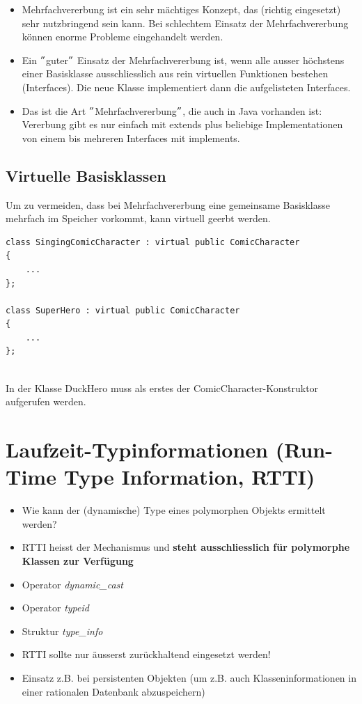 \begin{itemize}
	\item Mehrfachvererbung ist ein sehr mächtiges Konzept, das (richtig eingesetzt) sehr nutzbringend sein kann. Bei schlechtem Einsatz der Mehrfachvererbung können enorme Probleme eingehandelt werden.
	\item Ein $"$guter$"$ Einsatz der Mehrfachvererbung ist, wenn alle ausser höchstens einer Basisklasse ausschliesslich aus rein virtuellen Funktionen bestehen (Interfaces). Die neue Klasse implementiert dann die aufgelisteten Interfaces.
	\item Das ist die Art $"$Mehrfachvererbung$"$, die auch in Java vorhanden ist: Vererbung gibt es nur einfach mit extends plus beliebige Implementationen von einem bis mehreren Interfaces mit implements.
\end{itemize}

\subsection{Virtuelle Basisklassen}
Um zu vermeiden, dass bei Mehrfachvererbung eine gemeinsame Basisklasse mehrfach im Speicher vorkommt, kann virtuell geerbt werden.\\
\begin{minipage}{0.75\linewidth}
	\vspace{-\baselineskip}
\begin{lstlisting}
class SingingComicCharacter : virtual public ComicCharacter
{
	...
};

class SuperHero : virtual public ComicCharacter
{
	...
};
\end{lstlisting}
\end{minipage}\\
In der Klasse DuckHero muss als erstes der ComicCharacter-Konstruktor aufgerufen werden.

\section{Laufzeit-Typinformationen (Run-Time Type Information, RTTI)}
\begin{itemize}
	\item Wie kann der (dynamische) Type eines polymorphen Objekts ermittelt werden?
	\item RTTI heisst der Mechanismus und \textbf{steht ausschliesslich für polymorphe Klassen zur Verfügung}
	\item Operator \emph{dynamic\_cast}
	\item Operator \emph{typeid}
	\item Struktur \emph{type\_info}
	\item[\-]
	\begin{achtung}
		RTTI sollte nur äusserst zurückhaltend eingesetzt werden!
	\end{achtung}
	\item Einsatz z.B. bei persistenten Objekten (um z.B. auch Klasseninformationen in einer rationalen Datenbank abzuspeichern)
\end{itemize}

